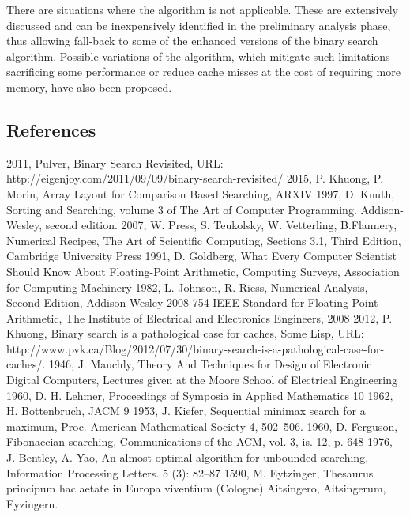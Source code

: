 \documentclass[preprint,1p,times]{elsarticle}
\begin{document}
There are situations where the algorithm is not applicable. These are extensively discussed and can be inexpensively identified in the preliminary analysis phase, thus allowing fall-back to some of the enhanced versions of the binary search algorithm. Possible variations of the algorithm, which mitigate such limitations sacrificing some performance or reduce cache misses at the cost of requiring more memory, have also been proposed.

\begin{thebibliography}{9}
\section{References}
 2011, Pulver, Binary Search Revisited, URL: http://eigenjoy.com/2011/09/09/binary-search-revisited/
 2015, P. Khuong, P. Morin, Array Layout for Comparison Based Searching, ARXIV
 1997, D. Knuth, Sorting and Searching, volume 3 of The Art of Computer Programming. Addison-Wesley, second edition.
 2007, W. Press, S. Teukolsky, W. Vetterling, B.Flannery, Numerical Recipes, The Art of Scientific Computing, Sections 3.1, Third Edition, Cambridge University Press
 1991, D. Goldberg, What Every Computer Scientist Should Know About Floating-Point Arithmetic, Computing Surveys, Association for Computing Machinery
 1982, L. Johnson, R. Riess, Numerical Analysis, Second Edition, Addison Wesley
 2008-754 IEEE Standard for Floating-Point Arithmetic, The Institute of Electrical and Electronics Engineers, 2008
 2012, P. Khuong, Binary search is a pathological case for caches, Some Lisp, URL: http://www.pvk.ca/Blog/2012/07/30/binary-search-is-a-pathological-case-for-caches/.
 1946, J. Mauchly, Theory And Techniques for Design of Electronic Digital Computers, Lectures given at the Moore School of Electrical Engineering
 1960, D. H. Lehmer, Proceedings of Symposia in Applied Mathematics 10
 1962, H. Bottenbruch, JACM 9
 1953, J. Kiefer, Sequential minimax search for a maximum, Proc. American Mathematical Society 4, 502–506.
 1960, D. Ferguson, Fibonaccian searching, Communications of the ACM, vol. 3, is. 12, p. 648
 1976, J. Bentley, A. Yao, An almost optimal algorithm for unbounded searching, Information Processing Letters. 5 (3): 82–87
 1590, M. Eytzinger, Thesaurus principum hac aetate in Europa viventium (Cologne)
Aitsingero, Aitsingerum, Eyzingern.
\end{thebibliography}
\end{document}
